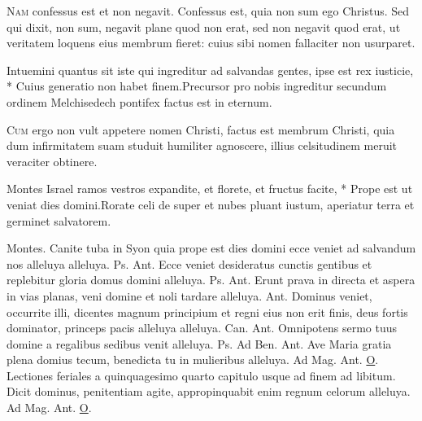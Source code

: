 \begin{multicols*}{2}
\lettrine[lines=2]{\zallmancaps \color{Red} N}{am} confessus est et non negavit. Confessus est, quia non sum ego Christus. Sed qui dixit, non sum, negavit plane quod non erat, sed non negavit quod erat, ut veritatem loquens eius membrum fieret: cuius sibi nomen fallaciter non usurparet.
\begin{responsory}
{Intuemini quantus sit iste qui ingreditur ad salvandas gentes, ipse est rex iusticie, * Cuius generatio non habet finem.}{Precursor pro nobis ingreditur secundum ordinem Melchisedech pontifex factus est in eternum.}
\end{responsory}
\lettrine[lines=2]{\zallmancaps \color{Blue} C}{um} ergo non vult appetere nomen Christi, factus est membrum Christi, quia dum infirmitatem suam studuit humiliter agnoscere, illius celsitudinem meruit veraciter obtinere.
\begin{responsory-doxology}
{Montes Israel ramos vestros expandite, et florete, et fructus facite, * Prope est ut veniat dies domini.}{Rorate celi de super et nubes pluant iustum, aperiatur terra et germinet salvatorem.}
\end{responsory-doxology}
Montes.
 Canite tuba in Syon quia prope est dies domini ecce veniet ad salvandum nos alleluya alleluya. {\color{Red} Ps.}  {\color{Red} Ant.} Ecce veniet desideratus cunctis gentibus et replebitur gloria domus domini alleluya. {\color{Red} Ps.}  {\color{Red} Ant.} Erunt prava in directa et aspera in vias planas, veni domine et noli tardare alleluya.  {\color{Red} Ant.} Dominus veniet, occurrite illi, dicentes magnum principium et regni eius non erit finis, deus fortis dominator, princeps pacis alleluya alleluya. {\color{Red} Can.}  {\color{Red} Ant.} Omnipotens sermo tuus domine a regalibus sedibus venit alleluya. {\color{Red} Ps.}  {\color{Red} Ad Ben. Ant.} Ave Maria gratia plena domius tecum, benedicta tu in mulieribus alleluya. {\color{Red} Ad Mag. Ant.} \hyperlink{o-antiphons}{O}.
\newline Lectiones feriales a quinquagesimo quarto capitulo usque ad finem ad libitum.
 \hypertarget{ant-dicit-dominus}{Dicit} dominus, penitentiam agite, appropinquabit enim regnum celorum alleluya. {\color{Red} Ad Mag. Ant.} \hyperlink{o-antiphons}{O}.

\end{multicols*}
